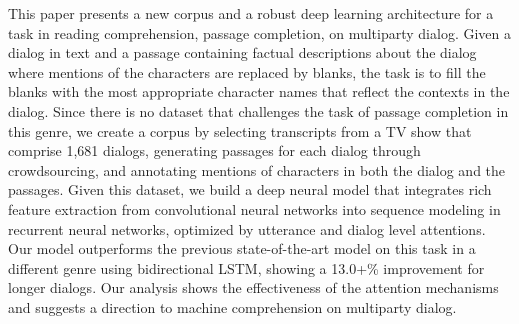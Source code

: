 This paper presents a new corpus and a robust deep learning architecture for a task in reading comprehension, passage completion, on multiparty dialog. Given a dialog in text and a passage containing factual descriptions about the dialog where mentions of the characters are replaced by blanks, the task is to fill the blanks with the most appropriate character names that reflect the contexts in the dialog. Since there is no dataset that challenges the task of passage completion in this genre, we create a corpus by selecting transcripts from a TV show that comprise 1,681 dialogs, generating passages for each dialog through crowdsourcing, and annotating mentions of characters in both the dialog and the passages. Given this dataset, we build a deep neural model that integrates rich feature extraction from convolutional neural networks into sequence modeling in recurrent neural networks, optimized by utterance and dialog level attentions. Our model outperforms the previous state-of-the-art model on this task in a different genre using bidirectional LSTM, showing a 13.0+\% improvement for longer dialogs. Our analysis shows the effectiveness of the attention mechanisms and suggests a direction to machine comprehension on multiparty dialog.
